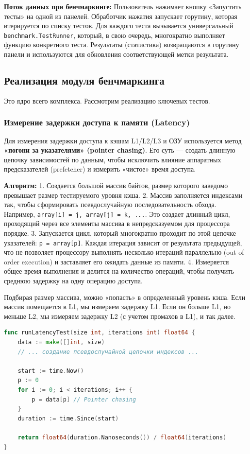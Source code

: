 \textbf{Поток данных при бенчмаркинге:} Пользователь нажимает кнопку «Запустить тесты» на одной из панелей. Обработчик нажатия запускает горутину, которая итерируется по списку тестов. Для каждого теста вызывается универсальный \texttt{benchmark.TestRunner}, который, в свою очередь, многократно выполняет функцию конкретного теста. Результаты (статистика) возвращаются в горутину панели и используются для обновления соответствующей метки результата.

\subsection{Реализация модуля бенчмаркинга}

Это ядро всего комплекса. Рассмотрим реализацию ключевых тестов.

\subsubsection{Измерение задержки доступа к памяти (Latency)}

Для измерения задержки доступа к кэшам L1/L2/L3 и ОЗУ используется метод \textbf{«погони за указателями» (pointer chasing)}. Его суть — создать длинную цепочку зависимостей по данным, чтобы исключить влияние аппаратных предсказателей (prefetcher) и измерить «чистое» время доступа.

\textbf{Алгоритм:}
1. Создается большой массив байтов, размер которого заведомо превышает размер тестируемого уровня кэша.
2. Массив заполняется индексами так, чтобы сформировать псевдослучайную последовательность обхода. Например, \texttt{array[i] = j, array[j] = k, ...}. Это создает длинный цикл, проходящий через все элементы массива в непредсказуемом для процессора порядке.
3. Запускается цикл, который многократно проходит по этой цепочке указателей: \texttt{p = array[p]}. Каждая итерация зависит от результата предыдущей, что не позволяет процессору выполнять несколько итераций параллельно (out-of-order execution) и заставляет его ожидать данные из памяти.
4. Измеряется общее время выполнения и делится на количество операций, чтобы получить среднюю задержку на одну операцию доступа.

Подбирая размер массива, можно «попасть» в определенный уровень кэша. Если массив помещается в L1, мы измеряем задержку L1. Если он больше L1, но меньше L2, мы измеряем задержку L2 (с учетом промахов в L1), и так далее.

\begin{lstlisting}[language=Go, caption={Фрагмент кода для измерения задержки}]
func runLatencyTest(size int, iterations int) float64 {
    data := make([]int, size)
    // ... создание псевдослучайной цепочки индексов ...

    start := time.Now()
    p := 0
    for i := 0; i < iterations; i++ {
        p = data[p] // Pointer chasing
    }
    duration := time.Since(start)

    return float64(duration.Nanoseconds()) / float64(iterations)
}
\end{lstlisting}

